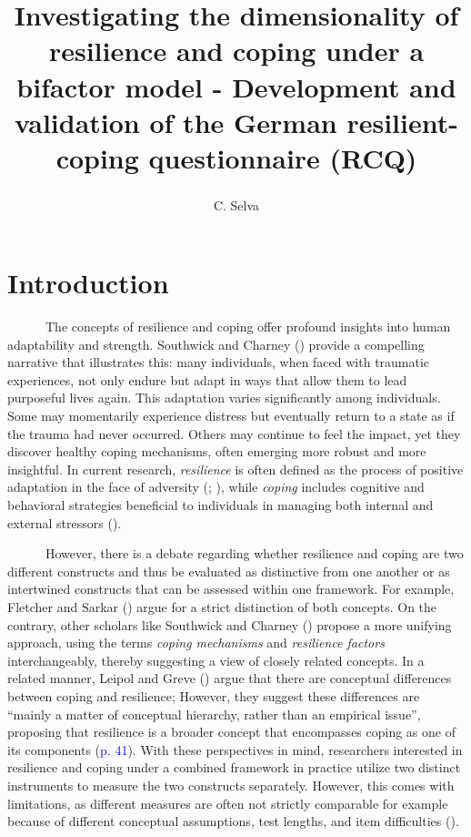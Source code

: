 \documentclass[
  man,floatsintext]{apa7}
\title{Investigating the dimensionality of resilience and coping under a bifactor model - Development and validation of the German resilient-coping questionnaire (RCQ)}
\author{C. Selva \orcidlink{0000-0001-9980-7127}\textsuperscript{}}
\date{}
\affiliation{\vspace{0.5cm}\textsuperscript{} University of Münster, Department of Psychology - Statistics and Psychological Methods}
\begin{document}
\maketitle


\section{Introduction}\label{introduction}

\justifying

~~~~~~The concepts of resilience and coping offer profound insights into human adaptability and strength. Southwick and Charney () provide a compelling narrative that illustrates this: many individuals, when faced with traumatic experiences, not only endure but adapt in ways that allow them to lead purposeful lives again. This adaptation varies significantly among individuals. Some may momentarily experience distress but eventually return to a state as if the trauma had never occurred. Others may continue to feel the impact, yet they discover healthy coping mechanisms, often emerging more robust and more insightful. In current research, \emph{resilience} is often defined as the process of positive adaptation in the face of adversity (; ), while \emph{coping} includes cognitive and behavioral strategies beneficial to individuals in managing both internal and external stressors ().

~~~~~~However, there is a debate regarding whether resilience and coping are two different constructs and thus be evaluated as distinctive from one another or as intertwined constructs that can be assessed within one framework. For example, Fletcher and Sarkar () argue for a strict distinction of both concepts. On the contrary, other scholars like Southwick and Charney () propose a more unifying approach, using the terms \emph{coping mechanisms} and \emph{resilience factors} interchangeably, thereby suggesting a view of closely related concepts. In a related manner, Leipol and Greve () argue that there are conceptual differences between coping and resilience; However, they suggest these differences are ``mainly a matter of conceptual hierarchy, rather than an empirical issue'', proposing that resilience is a broader concept that encompasses coping as one of its components (\textcolor{blue}{p. 41}). With these perspectives in mind, researchers interested in resilience and coping under a combined framework in practice utilize two distinct instruments to measure the two constructs separately. However, this comes with limitations, as different measures are often not strictly comparable for example because of different conceptual assumptions, test lengths, and item difficulties ().
\end{document}
